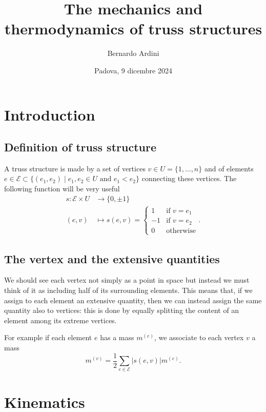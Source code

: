 \documentclass[a4paper,11pt]{article}
\theoremstyle{definition}
\begin{document}
\author{Bernardo Ardini}
\date{Padova, 9 dicembre 2024}
\title{\bfseries The mechanics and thermodynamics of truss structures}

\maketitle

\section{Introduction}

\subsection*{Definition of truss structure}

A truss structure is made by a set of vertices $v\in U=\{1,\dots,n\}$ and of elements $e\in\mathscr{E}\subset\{(e_1,e_2)\;|\;\text{$e_1,e_2\in U$ and $e_1<e_2$}\}$ connecting these vertices. The following function will be very useful
\begin{align*}
s\colon\mathscr{E}\times U&\to\{0,\pm1\} \\
(e,v)&\mapsto s(e,v)=
\begin{cases}
1 & \text{if $v=e_1$} \\
-1 & \text{if $v=e_2$} \\
0 & \text{otherwise}
\end{cases}.
\end{align*}

\subsection*{The vertex and the extensive quantities}

We should see each vertex not simply as a point in space but instead we must think of it as including half of its surrounding elements. This means that, if we assign to each element an extensive quantity, then we can instead assign the same quantity also to vertices: this is done by equally splitting the content of an element among its extreme vertices.

For example if each element $e$ has a mass $m^{(e)}$, we associate to each vertex $v$ a mass
\[
m^{(v)}=\frac{1}{2}\sum_{e\in\mathscr{E}}|s(e,v)|m^{(e)}.
\]

\section{Kinematics}
\end{document}
